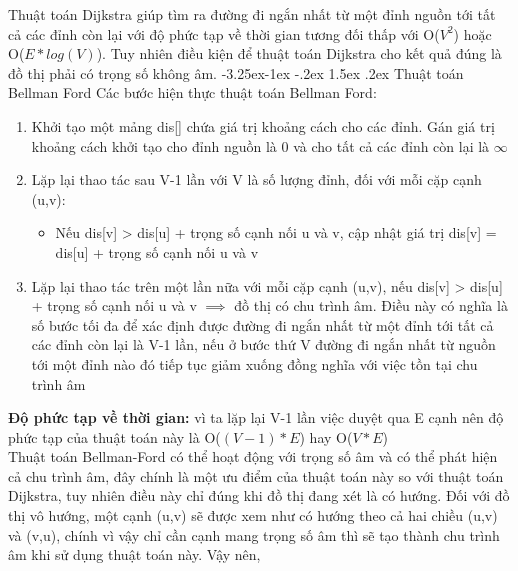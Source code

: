 \documentclass[a4paper]{article}
\makeatletter
\newcounter {subsubsubsection}[subsubsection]
\newcommand\subsubsubsection{\@startsection{subsubsubsection}{4}{\z@}%
                                     {-3.25ex\@plus -1ex \@minus -.2ex}%
                                     {1.5ex \@plus .2ex}%
                                     {\normalfont\normalsize\bfseries}}
\makeatother
\begin{document}
\begin{center}
\end{center}    
Thuật toán Dijkstra giúp tìm ra đường đi ngắn nhất từ một đỉnh nguồn tới tất cả các đỉnh còn lại với độ phức tạp về thời gian tương đối thấp với O($V^2$) hoặc O($E*log(V)$). Tuy nhiên điều kiện để thuật toán Dijkstra cho kết quả đúng là đồ thị phải có trọng số không âm.
            \subsubsubsection{Thuật toán Bellman Ford}
Các bước hiện thực thuật toán Bellman Ford:
\begin{enumerate}
    \item Khởi tạo một mảng dis[] chứa giá trị khoảng cách cho các đỉnh. Gán giá trị khoảng cách khởi tạo cho đỉnh nguồn là 0 và cho tất cả các đỉnh còn lại là $\infty$
    \item Lặp lại thao tác sau V-1 lần với V là số lượng đỉnh, đối với mỗi cặp cạnh (u,v):
    \begin{itemize}
        \item Nếu dis[v] > dis[u] + trọng số cạnh nối u và v, cập nhật giá trị dis[v] = dis[u] + trọng số cạnh nối u và v
    \end{itemize}
    \item Lặp lại thao tác trên một lần nữa với mỗi cặp cạnh (u,v), nếu dis[v] > dis[u] + trọng số cạnh nối u và v $\implies$ đồ thị có chu trình âm. Điều này có nghĩa là số bước tối đa để xác định được đường đi ngắn nhất từ một đỉnh tới tất cả các đỉnh còn lại là V-1 lần, nếu ở bước thứ V đường đi ngắn nhất từ nguồn tới một đỉnh nào đó tiếp tục giảm xuống đồng nghĩa với việc tồn tại chu trình âm
\end{enumerate}
\textbf{Độ phức tạp về thời gian:} vì ta lặp lại V-1 lần việc duyệt qua E cạnh nên độ phức tạp của thuật toán này là O($(V-1)*E$) hay O($V*E$) \\
Thuật toán Bellman-Ford có thể hoạt động với trọng số âm và có thể phát hiện cả chu trình âm, đây chính là một ưu điểm của thuật toán này so với thuật toán Dijkstra, tuy nhiên điều này chỉ đúng khi đồ thị đang xét là có hướng. Đối với đồ thị vô hướng, một cạnh (u,v) sẽ được xem như có hướng theo cả hai chiều (u,v) và (v,u), chính vì vậy chỉ cần cạnh mang trọng số âm thì sẽ tạo thành chu trình âm khi sử dụng thuật toán này. Vậy nên, 
\end{document}
